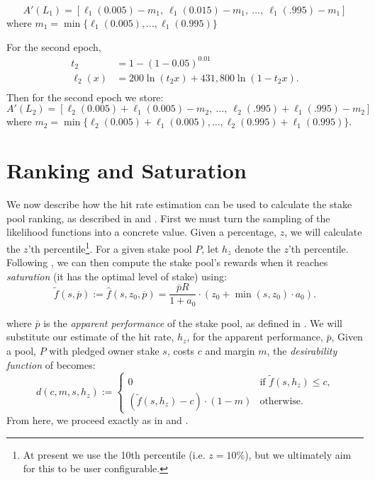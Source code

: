 \documentclass[11pt,a4paper,dvipsnames,twosided]{article}
\newcommand\pbar{\overline{p}}
\begin{document}
\[ A'(L_1) = [\ell_1(0.005)-m_1,~\ell_1(0.015)-m_1,~\ldots,~\ell_1(.995)-m_1] \]
where $m_1=\min\{\ell_1(0.005),\ldots,\ell_1(0.995)\}$

For the second epoch,
\[
\begin{array}{rl}
  t_2 &= 1-(1-0.05)^{0.01} \\
  \ell_2(x) &= 200 \ln(t_2 x) + 431,800 \ln(1 - t_2 x).\\
\end{array}
\]
Then for the second epoch we store:
\[ A'(L_2) = [\ell_2(0.005)+\ell_1(0.005)-m_2,~\ldots,~\ell_2(.995)+\ell_1(.995)-m_2] \]
where $m_2=\min\{\ell_2(0.005)+\ell_1(0.005),\ldots,\ell_2(0.995)+\ell_1(0.995)\}$.

\section{Ranking and Saturation}

We now describe how the hit rate estimation can be used to calculate the stake pool ranking,
as described in \cite{bkks2018} and \cite[Section 5.6]{delegation_design}.
First we must turn the sampling of the likelihood functions into a concrete value.
Given a percentage, $z$, we will calculate the $z$'th percentile\footnote{At present we use the 10th percentile (i.e. $z=10\%$), but we ultimately aim for this to be user configurable.}.
For a given stake pool $P$, let $h_z$ denote the $z$'th percentile.
%
Following \cite[Section 5.6.1]{delegation_design},
we can then compute the stake pool's rewards when it reaches \emph{saturation} (it has the optimal level of stake) using:
\[
    \tilde{f}(s, \pbar) :=
    \hat{f}(s,z_0,\pbar)=
    \frac{\pbar R}{1 + a_0}
    \cdot
    \left(z_0 + \min(s,z_0)\cdot a_0\right).
\]

where $\bar{p}$ is the \textit{apparent performance} of the stake pool, as defined in
\cite[Section 5.5.2]{delegation_design}.
We will substitute our estimate of the hit rate, $h_z$, for the apparent performance, $\bar{p}$,
Given a pool, $P$ with pledged owner stake \(s\), costs \(c\) and margin \(m\),
the \emph{desirability function} of \cite[Section 5.6.1]{delegation_design} becomes:
\[
    d(c, m, s, h_z) :=
    \left\{
    \begin{array}{ll}
        \displaystyle 0 &
        \text{if $\tilde{f}(s,h_z)\leq c$,} \\
        \displaystyle\left(\tilde{f}(s,h_z) - c\right)\cdot(1-m) &
        \text{otherwise.}
    \end{array}
    \right.
\]
From here, we proceed exactly as in
\cite[Section 5.6.2]{delegation_design} and
\cite[Section 5.6.4]{delegation_design}.
\end{document}
